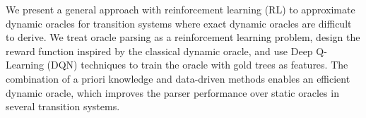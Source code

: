 We present a general approach with reinforcement learning (RL) to approximate dynamic oracles for transition systems where exact dynamic oracles are difficult to derive. We treat oracle parsing as a reinforcement learning problem, design the reward function inspired by the classical dynamic oracle, and use Deep Q-Learning (DQN) techniques to train the oracle with gold trees as features. The combination of a priori knowledge and data-driven methods enables an efficient dynamic oracle, which improves the parser performance over static oracles in several transition systems.
